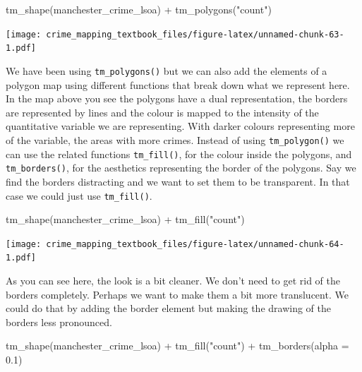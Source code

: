 \documentclass[
]{book}
\newenvironment{Shaded}{\begin{snugshade}}{\end{snugshade}}
\newcommand{\AttributeTok}[1]{\textcolor[rgb]{0.77,0.63,0.00}{#1}}
\newcommand{\FloatTok}[1]{\textcolor[rgb]{0.00,0.00,0.81}{#1}}
\newcommand{\FunctionTok}[1]{\textcolor[rgb]{0.00,0.00,0.00}{#1}}
\newcommand{\NormalTok}[1]{#1}
\newcommand{\SpecialCharTok}[1]{\textcolor[rgb]{0.00,0.00,0.00}{#1}}
\newcommand{\StringTok}[1]{\textcolor[rgb]{0.31,0.60,0.02}{#1}}
\begin{document}
\begin{Shaded}
\begin{Highlighting}[]
\FunctionTok{tm\_shape}\NormalTok{(manchester\_crime\_lsoa) }\SpecialCharTok{+} 
  \FunctionTok{tm\_polygons}\NormalTok{(}\StringTok{"count"}\NormalTok{)}
\end{Highlighting}
\end{Shaded}

\texttt{[image: crime\_mapping\_textbook\_files/figure-latex/unnamed-chunk-63-1.pdf]}

We have been using \texttt{tm\_polygons()} but we can also add the elements of a polygon map using different functions that break down what we represent here. In the map above you see the polygons have a dual representation, the borders are represented by lines and the colour is mapped to the intensity of the quantitative variable we are representing. With darker colours representing more of the variable, the areas with more crimes. Instead of using \texttt{tm\_polygon()} we can use the related functions \texttt{tm\_fill()}, for the colour inside the polygons, and \texttt{tm\_borders()}, for the aesthetics representing the border of the polygons. Say we find the borders distracting and we want to set them to be transparent. In that case we could just use \texttt{tm\_fill()}.

\begin{Shaded}
\begin{Highlighting}[]
\FunctionTok{tm\_shape}\NormalTok{(manchester\_crime\_lsoa) }\SpecialCharTok{+} 
  \FunctionTok{tm\_fill}\NormalTok{(}\StringTok{"count"}\NormalTok{)}
\end{Highlighting}
\end{Shaded}

\texttt{[image: crime\_mapping\_textbook\_files/figure-latex/unnamed-chunk-64-1.pdf]}

As you can see here, the look is a bit cleaner. We don't need to get rid of the borders completely. Perhaps we want to make them a bit more translucent. We could do that by adding the border element but making the drawing of the borders less pronounced.

\begin{Shaded}
\begin{Highlighting}[]
\FunctionTok{tm\_shape}\NormalTok{(manchester\_crime\_lsoa) }\SpecialCharTok{+} 
  \FunctionTok{tm\_fill}\NormalTok{(}\StringTok{"count"}\NormalTok{) }\SpecialCharTok{+}
  \FunctionTok{tm\_borders}\NormalTok{(}\AttributeTok{alpha =} \FloatTok{0.1}\NormalTok{)}
\end{Highlighting}
\end{Shaded}
\end{document}
